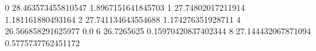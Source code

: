 0 28.463573455810547 1.8967151641845703
1 27.74802017211914 1.181161880493164
2 27.741134643554688 1.174276351928711
4 26.566858291625977 0.0
6 26.7265625 0.15970420837402344
8 27.144432067871094 0.5775737762451172

